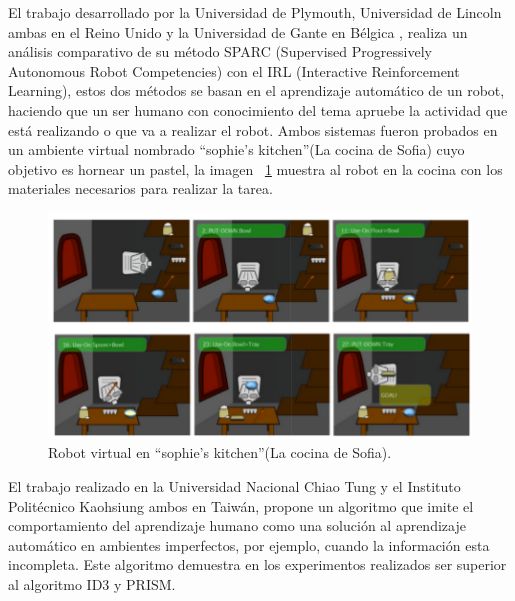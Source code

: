 El trabajo desarrollado por la Universidad de Plymouth, Universidad de
 Lincoln ambas en el Reino Unido y la Universidad de Gante en Bélgica
 \cite{Senft2016}, realiza un análisis comparativo de su método SPARC (Supervised
 Progressively Autonomous Robot Competencies) con el IRL (Interactive
 Reinforcement Learning), estos dos métodos se basan en el aprendizaje 
 automático de un robot, haciendo que un ser humano con conocimiento del tema
 apruebe la actividad que está realizando o que va a realizar el robot.
 Ambos sistemas fueron probados en un ambiente virtual nombrado ``sophie’s
 kitchen''(La cocina de Sofia) cuyo objetivo es hornear un pastel, 
 la imagen ~\ref{fig:sparcrob} muestra al robot en la cocina con los materiales
 necesarios para realizar la tarea. 
 
\begin{figure}[H]
\centering
\includegraphics[width=0.8\columnwidth]{CapituloI/Imagenes/Sparc.png}
\caption{Robot virtual en “sophie’s kitchen”(La cocina de Sofia).}
\label{fig:sparcrob}
\end{figure}


El trabajo realizado en la Universidad Nacional Chiao Tung y el Instituto
 Politécnico Kaohsiung ambos en Taiwán\cite{Chang1996}, propone un algoritmo
 que imite el comportamiento del aprendizaje humano como una solución al
 aprendizaje automático en ambientes imperfectos, por ejemplo, cuando la
 información esta incompleta. Este algoritmo demuestra en los experimentos
 realizados ser superior al algoritmo ID3 y PRISM.